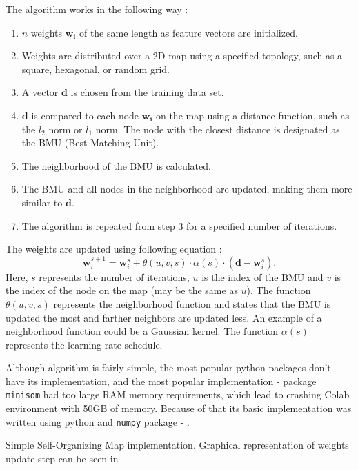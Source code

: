 The algorithm works in the following way \cite{somTutorial}: 
\begin{enumerate}
    \item $n$ weights $\mathbf{w_i}$ of the same length as feature vectors are initialized.
    \item Weights are distributed over a 2D map using a specified topology, such as a square, hexagonal, or random grid.
    \item A vector $\mathbf{d}$ is chosen from the training data set.
    \item $\mathbf{d}$ is compared to each node $\mathbf{w_i}$ on the map using a distance function, such as the $l_2$ norm or $l_1$ norm. The node with the closest distance is designated as the BMU (Best Matching Unit).
    \item The neighborhood of the BMU is calculated.
    \item The BMU and all nodes in the neighborhood are updated, making them more similar to $\mathbf{d}$.
    \item The algorithm is repeated from step 3 for a specified number of iterations.
\end{enumerate}

The weights are updated using following equation \cite{somWikipedia}:
\[\mathbf{w}_i^{s+1} = \mathbf{w}_i^s + \theta(u, v, s) \cdot \alpha(s) \cdot (\mathbf{d} - \mathbf{w}_i^s).\]
Here, $s$ represents the number of iterations, $u$ is the index of the BMU and $v$ is the index of the node on the map (may be the same as $u$). 
The function $\theta(u, v, s)$ represents the neighborhood function and states that the BMU is updated the most and farther neighbors are updated less. 
An example of a neighborhood function could be a Gaussian kernel. 
The function $\alpha(s)$ represents the learning rate schedule.

Although algorithm is fairly simple, the most popular python packages don't have its implementation, and the most popular implementation - package \texttt{minisom} had too large RAM memory requirements, which lead to crashing Colab environment with 50GB of memory.
Because of that its basic implementation was written using python and \texttt{numpy} package - . 

\newenvironment{longlistingB}{\captionsetup{type=listing, width=0.8\textwidth}}{}

\begin{longlistingB}
    \caption{Simple Self-Organizing Map implementation. Graphical representation of weights update step can be seen in }
    \label{lst:som}
\end{longlistingB}
\vspace{12pt}

